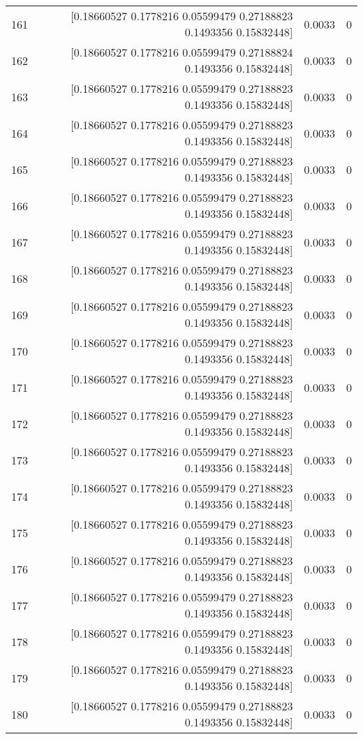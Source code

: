 \begin{longtable}{lrrr}
161 & [0.18660527 0.1778216  0.05599479 0.27188823 0.1493356  0.15832448] & 0.0033 & 0 \\
162 & [0.18660527 0.1778216  0.05599479 0.27188824 0.1493356  0.15832448] & 0.0033 & 0 \\
163 & [0.18660527 0.1778216  0.05599479 0.27188823 0.1493356  0.15832448] & 0.0033 & 0 \\
164 & [0.18660527 0.1778216  0.05599479 0.27188823 0.1493356  0.15832448] & 0.0033 & 0 \\
165 & [0.18660527 0.1778216  0.05599479 0.27188823 0.1493356  0.15832448] & 0.0033 & 0 \\
166 & [0.18660527 0.1778216  0.05599479 0.27188823 0.1493356  0.15832448] & 0.0033 & 0 \\
167 & [0.18660527 0.1778216  0.05599479 0.27188823 0.1493356  0.15832448] & 0.0033 & 0 \\
168 & [0.18660527 0.1778216  0.05599479 0.27188823 0.1493356  0.15832448] & 0.0033 & 0 \\
169 & [0.18660527 0.1778216  0.05599479 0.27188823 0.1493356  0.15832448] & 0.0033 & 0 \\
170 & [0.18660527 0.1778216  0.05599479 0.27188823 0.1493356  0.15832448] & 0.0033 & 0 \\
171 & [0.18660527 0.1778216  0.05599479 0.27188823 0.1493356  0.15832448] & 0.0033 & 0 \\
172 & [0.18660527 0.1778216  0.05599479 0.27188823 0.1493356  0.15832448] & 0.0033 & 0 \\
173 & [0.18660527 0.1778216  0.05599479 0.27188823 0.1493356  0.15832448] & 0.0033 & 0 \\
174 & [0.18660527 0.1778216  0.05599479 0.27188823 0.1493356  0.15832448] & 0.0033 & 0 \\
175 & [0.18660527 0.1778216  0.05599479 0.27188823 0.1493356  0.15832448] & 0.0033 & 0 \\
176 & [0.18660527 0.1778216  0.05599479 0.27188823 0.1493356  0.15832448] & 0.0033 & 0 \\
177 & [0.18660527 0.1778216  0.05599479 0.27188823 0.1493356  0.15832448] & 0.0033 & 0 \\
178 & [0.18660527 0.1778216  0.05599479 0.27188823 0.1493356  0.15832448] & 0.0033 & 0 \\
179 & [0.18660527 0.1778216  0.05599479 0.27188823 0.1493356  0.15832448] & 0.0033 & 0 \\
180 & [0.18660527 0.1778216  0.05599479 0.27188823 0.1493356  0.15832448] & 0.0033 & 0 \\

\end{longtable}
